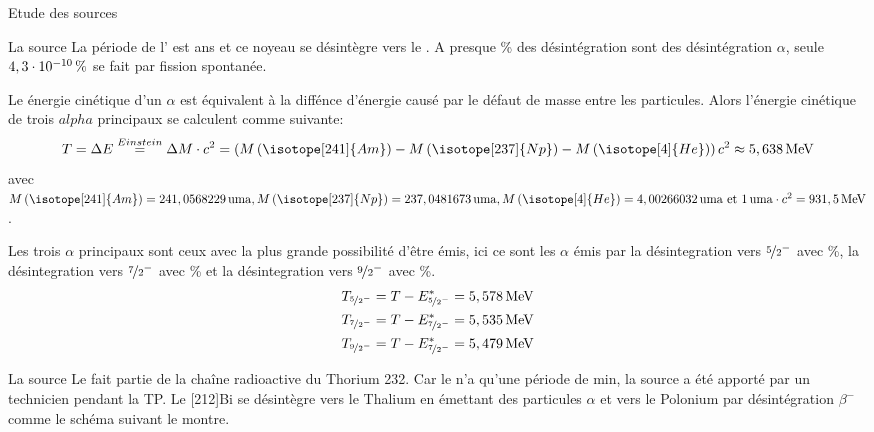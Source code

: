 \documentclass[a4paper,11pt]{scrartcl}
\begin{document}
 \begin{section}{Etude des sources}
  \begin{subsection}{La source }
   La période de l' est \unit[432,6]{ans} et ce noyeau se désintègre vers le . A presque \unit[100]{\%} des désintégration sont des désintégration $\alpha$, seule $\unit[4,3\cdot10^{-10}]{\%}$ 
   se fait par fission spontanée.  


   Le énergie cinétique d'un $\alpha$ est équivalent à la diffénce d'énergie causé par le défaut de masse entre les particules. Alors l'énergie cinétique de trois $alpha$ principaux se calculent comme suivante:
   \begin{equation*}
    T=\Delta E\stackrel{Einstein}{=}\Delta M\cdot c^2=\left(M\left(\isotope[241]{Am}\right)-M\left(\isotope[237]{Np}\right)-M\left(\isotope[4]{He}\right)\right)c^2\approx\unit[5,638]{MeV}
   \end{equation*}
   avec $M\left(\isotope[241]{Am}\right)=\unit[241,0568229]{uma},M\left(\isotope[237]{Np}\right)=\unit[237,0481673]{uma}, M\left(\isotope[4]{He}\right)=\unit[4,00266032]{uma}\text{ et }\unit[1]{uma}\cdot c^2=\unit[931,5]{MeV}$.

   Les trois $\alpha$ principaux sont ceux avec la plus grande possibilité d'être émis, ici ce sont les $\alpha$ émis par la désintegration vers  $\nicefrac{5}{2}^-$ avec \unit[84,85]{\%}, la désintegration vers  $\nicefrac{7}{2}^-$ avec \unit[13,23]{\%} et la désintegration vers  $\nicefrac{9}{2}^-$ avec \unit[1,66]{\%}.
   \begin{eqnarray*}
    T_{\nicefrac{5}{2}^-}=T-E^*_{\nicefrac{5}{2}^-}=\unit[5,578]{MeV}\\
    T_{\nicefrac{7}{2}^-}=T-E^*_{\nicefrac{7}{2}^-}=\unit[5,535]{MeV}\\
    T_{\nicefrac{9}{2}^-}=T-E^*_{\nicefrac{7}{2}^-}=\unit[5,479]{MeV}
   \end{eqnarray*}
  \end{subsection}
 
  \begin{subsection}{La source }
   Le  fait partie de la chaîne radioactive du Thorium 232. Car le   n'a qu'une période de \unit[60,5]{min}, la source a été apporté par un technicien pendant la TP. Le [212]{Bi} se désintègre vers le Thalium  en émettant des particules $\alpha$  et vers le Polonium par désintégration $\beta^-$ comme le schéma suivant le montre.


\end{subsection}
\end{section}
\end{document}
